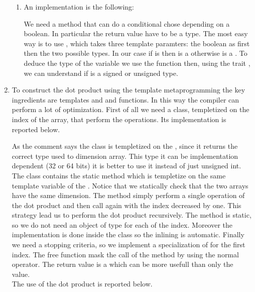 \begin{enumerate}
\begin{enumerate}
        \item An implementation is the following:
        \lstset{basicstyle=\scriptsize\sf}
        
        \lstset{basicstyle=\sf}
        We need a method that can do a conditional chose depending on a boolean.
        In particular the return value have to be a type. The most easy way is to
        use , which takes three template paramters: the
        boolean as first then the two possible types. In our case if 
        is  then  is a  otherwise is a .
        To deduce the type of the variable  we use the function
         then, using the trait , we can understand
        if  is a signed or unsigned type.

    \end{enumerate}

    \item To construct the dot product using the template metaprogramming the key
    ingredients are templates and  and  functions. In this way the
    compiler can perform a lot of optimization. First of all we need a class,
    templetized on the index of the array, that perform the operations.
    Its implementation is reported below.
    \lstset{basicstyle=\scriptsize\sf}
    
    \lstset{basicstyle=\sf}
    As the comment says the class is templetized on the , since it
    returns the correct type used to dimension array. This type it can be
    implementation dependent (32 or 64 bits) it is better to use it instead of just
    unsigned int. The class  contains the static method 
    which is templetize on the same template variable of the .
    Notice that we statically check that the two arrays have the same dimension. The
    method simply perform a single operation of the dot product and then call again
     with the index decreased by one. This strategy lead us to perform
    the dot product recursively. The method is static, so we do not need an object
    of type  for each of the index.  Moreover the implementation is
    done inside the class so the inlining is automatic.  Finally we need a stopping
    criteria, so we implement a specialization of  for the first index.
    The free function  mask the call of the method  by
    using the normal \cpp{*} operator. The return value is a  which
    can be more usefull than only the value.\\
    The use of the dot product is reported below.
    \lstset{basicstyle=\scriptsize\sf}
    
    \lstset{basicstyle=\sf}

\end{enumerate}

